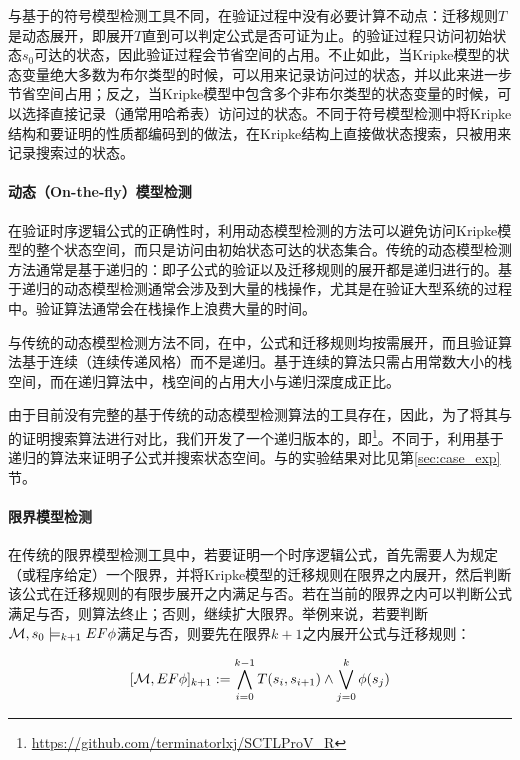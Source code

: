 与基于\BDD{}的符号模型检测工具不同，\sctlprov{}在验证过程中没有必要计算不动点：迁移规则$T$是动态展开，即展开$T$直到可以判定公式是否可证为止。\sctlprov{}的验证过程只访问初始状态$s_0$可达的状态，因此验证过程会节省空间的占用。不止如此，当Kripke模型的状态变量绝大多数为布尔类型的时候，\sctlprov{}可以用\BDD{}来记录访问过的状态，并以此来进一步节省空间占用；反之，当Kripke模型中包含多个非布尔类型的状态变量的时候，\sctlprov{}可以选择直接记录（通常用哈希表）访问过的状态。不同于符号模型检测中将Kripke结构和要证明的性质都编码到\BDD{}的做法，\sctlprov{}在Kripke结构上直接做状态搜索，\BDD{}只被用来记录搜索过的状态。

\paragraph{动态（On-the-fly）模型检测}
在验证时序逻辑公式的正确性时，利用动态模型检测的方法可以避免访问Kripke模型的整个状态空间，而只是访问由初始状态可达的状态集合。传统的\CTL{}动态模型检测方法\cite{VergauwenL93,BCG95}通常是基于递归的：即子公式的验证以及迁移规则的展开都是递归进行的。基于递归的\CTL{}动态模型检测通常会涉及到大量的栈操作，尤其是在验证大型系统的过程中。验证算法通常会在栈操作上浪费大量的时间。

与传统的\CTL{}动态模型检测方法不同，在\sctlprov{}中，公式和迁移规则均按需展开，而且验证算法基于连续（连续传递风格）而不是递归。基于连续的算法只需占用常数大小的栈空间\cite{Reynolds93,Appel06,Sestoft12}，而在递归算法中，栈空间的占用大小与递归深度成正比。

由于目前没有完整的基于传统的动态模型检测算法的工具存在，因此，为了将其与\sctlprov{}的证明搜索算法进行对比，我们开发了一个递归版本的\sctlprov{}，即\sctlprovr{}\footnote{\url{https://github.com/terminatorlxj/SCTLProV_R}}。不同于\sctlprov{}，\sctlprovr{}利用基于递归的算法来证明子公式并搜索状态空间。\sctlprov{}与\sctlprovr{}的实验结果对比见第\ref{sec:case_exp}节。

\paragraph{限界模型检测}
在传统的限界模型检测工具中，若要证明一个时序逻辑公式，首先需要人为规定（或程序给定）一个限界，并将Kripke模型的迁移规则在限界之内展开，然后判断该公式在迁移规则的有限步展开之内满足与否。若在当前的限界之内可以判断公式满足与否，则算法终止；否则，继续扩大限界。举例来说，若要判断${\cal M}, s_0 \models_{k+1} EF\phi$满足与否，则要先在限界$k+1$之内展开公式与迁移规则\cite{BCCZ99}：

\begin{small}
	$$ [{\cal M},EF\phi]_{k+1} := \bigwedge^{k-1}_{i=0}T(s_i,s_{i+1}) \wedge \bigvee_{j=0}^k\phi(s_j)$$
\end{small}

